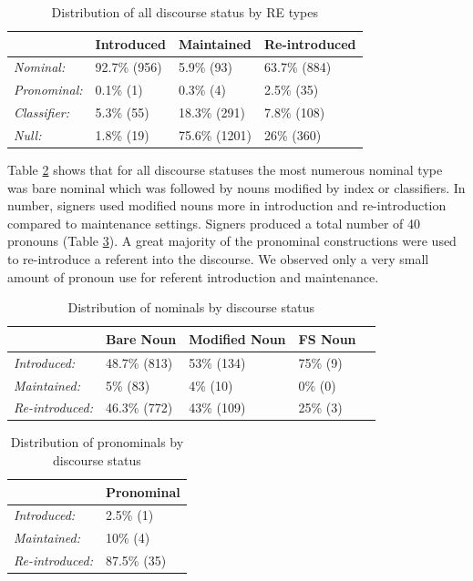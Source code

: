 \documentclass[]{elsarticle} %
\begin{document}
\begin{table}
\small
\caption{Distribution of all discourse status by RE types}
\label{tab:my-table}
\begin{tabular}{llll}
\hline
                     & Introduced    & Maintained     & Re-introduced \\ \hline
\textit{Nominal:}    & 92.7\% (956) & 5.9\% (93)    & 63.7\% (884) \\
\textit{Pronominal:} & 0.1\% (1)    & 0.3\% (4)     & 2.5\% (35)   \\
\textit{Classifier:} & 5.3\% (55)   & 18.3\% (291)  & 7.8\% (108)     \\
\textit{Null:}       & 1.8\% (19)   & 75.6\% (1201) & 26\% (360) \\ \hline
\end{tabular}%
\end{table}

Table \ref{tab:my-table2} shows that for all discourse statuses the most
numerous nominal type was bare nominal which was followed by nouns
modified by index or classifiers. In number, signers used modified nouns
more in introduction and re-introduction compared to maintenance
settings. Signers produced a total number of 40 pronouns (Table
\ref{tab:my-table3}). A great majority of the pronominal constructions
were used to re-introduce a referent into the discourse. We observed
only a very small amount of pronoun use for referent introduction and
maintenance.

\begin{table}
\small
\caption{Distribution of nominals by discourse status}
\label{tab:my-table2}
\begin{tabular}{lllll}
\hline
                        & Bare Noun  & Modified Noun & FS Noun \\ \hline
\textit{Introduced:}    & 48.7\% (813) & 53\% (134)     & 75\% (9) \\
\textit{Maintained:}    & 5\% (83)  & 4\% (10)      & 0\% (0) \\
\textit{Re-introduced:} & 46.3\% (772) & 43\% (109)     & 25\% (3) \\ \hline
\end{tabular}
\end{table}

\begin{table}
\small
\caption{Distribution of pronominals by discourse status}
\label{tab:my-table3}
\begin{tabular}{ll}
\hline
                        & Pronominal  \\ \hline
\textit{Introduced:}    & 2.5\% (1)   \\
\textit{Maintained:}    & 10\% (4)    \\
\textit{Re-introduced:} & 87.5\% (35) \\ \hline
\end{tabular}
\end{table}
\end{document}
